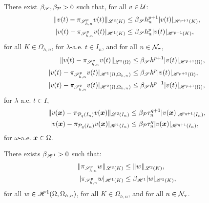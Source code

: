 \begin{lemma} %
    There exist $\beta_{\mathscr{S}}, \beta_{\mathcal{P}_{}} > 0$ such that, for all $v \in \mathcal{U}$:
    \begin{align}
        \lVert v(t) - \pi_{\mathscr{S}^p_{h, n}} v(t) \rVert_{\mathscr{L}^{2}(K)} &\leq \beta_{\mathscr{S}} h_n^{p + 1} \lvert v(t) \rvert_{\mathscr{H}^{p + 1}(K)}, \\
        \lvert v(t) - \pi_{\mathscr{S}^p_{h, n}} v(t) \rvert_{\mathscr{H}^{1}(K)} &\leq \beta_{\mathscr{S}} h_n^{p} \lvert v(t) \rvert_{\mathscr{H}^{p + 1}(K)},
    \end{align}
    for all $K \in \Omega_{h, n}$, for $\lambda$-a.e. $t \in I_n$, and for all $n \in \mathcal{N}_{\tau}$,
    \begin{align}
        \lVert v(t) - \pi_{\mathscr{S}^p_{h, n}} v(t) \rVert_{\mathscr{L}^{2}(\Omega)} &\leq \beta_{\mathscr{S}} h^{p + 1} \lvert v(t) \rvert_{\mathscr{H}^{p + 1}(\Omega)}, \\
        \lvert v(t) - \pi_{\mathscr{S}^p_{h, n}} v(t) \rvert_{\mathscr{H}^{1}(\Omega, \Omega_{h, n})} &\leq \beta_{\mathscr{S}} h^{p} \lvert v(t) \rvert_{\mathscr{H}^{p + 1}(\Omega)}, \\
        \lvert v(t) - \pi_{\mathscr{S}^p_{h, n}} v(t) \rvert_{\mathscr{H}^{2}(\Omega, \Omega_{h, n})} &\leq \beta_{\mathscr{S}} h^{p - 1} \lvert v(t) \rvert_{\mathscr{H}^{p + 1}(\Omega)},
    \end{align}
    for $\lambda$-a.e. $t \in I$,
    \begin{align}
        \lVert v(\bm{x}) - \pi_{\mathcal{P}_{q}(I_n)} v(\bm{x}) \rVert_{\mathscr{L}^{2}(I_n)} &\leq \beta_{\mathcal{P}_{}} \tau_n^{q + 1} \lvert v(\bm{x}) \rvert_{\mathscr{H}^{q + 1}(I_n)}, \\
        \lvert v(\bm{x}) - \pi_{\mathcal{P}_{q}(I_n)} v(\bm{x}) \rvert_{\mathscr{H}^{1}(I_n)} &\leq \beta_{\mathcal{P}_{}} \tau_n^{q} \lvert v(\bm{x}) \rvert_{\mathscr{H}^{q + 1}(I_n)},
    \end{align}
    for $\omega$-a.e. $\bm{x} \in \Omega$.
\end{lemma}

\begin{lemma}
    There exists $\beta_{\mathscr{H}^{1}} > 0$ such that:
    \begin{align}
        \lVert \pi_{\mathscr{S}^p_{h, n}} w \rVert_{\mathscr{L}^{2}(K)} &\leq \lVert w \rVert_{\mathscr{L}^{2}(K)}, \\
        \lvert \pi_{\mathscr{S}^p_{h, n}} w \rvert_{\mathscr{H}^{1}(K)} &\leq \beta_{\mathscr{H}^{1}} \lvert w \rvert_{\mathscr{H}^{1}(K)},
    \end{align}
    for all $w \in \mathscr{H}^{1}(\Omega, \Omega_{h, n})$, for all $K \in \Omega_{h, n}$, and for all $n \in \mathcal{N}_{\tau}$.
\end{lemma}


